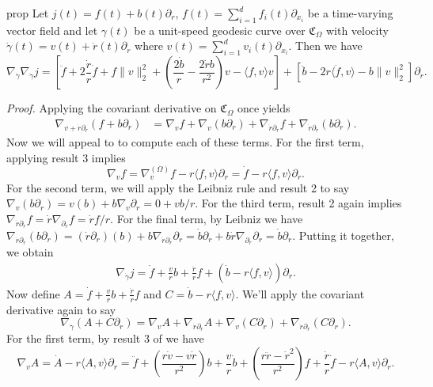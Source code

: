 \documentclass[11pt]{article}
\begin{document}
\begin{restatable}{prop}{} \label{jacobi equation on cone p1}
    Let $j(t) = f(t) + b(t)\partial_r$, $f(t) = \sum_{i = 1}^df_i(t)\partial_{x_i}$ be a time-varying vector field and let $\gamma(t)$ be a unit-speed geodesic curve over $\mathfrak{C}_\Omega$ with velocity $\dot \gamma(t) = v(t) + \dot r(t)\partial_r$ where $v(t) = \sum_{i = 1}^dv_i(t)\partial_{x_i}$. Then we have 
    \[\nabla_{\dot \gamma} \nabla_{\dot \gamma}j = \left[\ddot f + 2\frac{\dot r}{r}\dot f + f\|v\|_2^2  + \left(\frac{2\dot b}{r} - \frac{2 \dot rb}{r^2}\right)v - \langle f,v\rangle v\right] + \left[\ddot b - 2r\langle \dot f, v\rangle - b\|v\|_2^2\right]\partial_r.\]
\end{restatable}
\noindent \textit{Proof.} Applying the covariant derivative on $\mathfrak{C}_\Omega$ once yields
\begin{align*}
    \nabla_{v + \dot r \partial_r}(f + b\partial_r) &= \nabla_vf + \nabla_v(b\partial_r) + \nabla_{\dot r\partial_r}f + \nabla_{\dot r\partial_r}(b\partial_r).
\end{align*}
Now we will appeal to  to compute each of these terms. For the first term, applying result 3 implies
\[\nabla_vf = \nabla_{v}^{(\Omega)}f - r\langle f, v\rangle \partial_r = \dot f - r\langle f, v\rangle \partial_r.\]
For the second term, we will apply the Leibniz rule and result 2 to say $\nabla_v(b\partial_r) = v(b) + b\nabla_v\partial_r = 0 + vb/r$. For the third term, result 2 again implies $\nabla_{\dot r\partial_r}f = \dot r\nabla_{\partial_r}f = \dot rf/r.$ For the final term, by Leibniz we have $\nabla_{\dot r\partial_r}(b\partial_r) = (\dot r\partial_r)(b) + b\nabla_{\dot r\partial_r}\partial_r = \dot b\partial_r + b\dot r\nabla_{\partial_r}\partial_r = \dot b \partial_r$.
Putting it together, we obtain
\begin{align*}
    \nabla_{\dot \gamma}j = \dot f + \frac{v}{r}b + \frac{\dot r}{r}f + \left(\dot b - r \langle f, v\rangle \right)\partial_r.
\end{align*}
Now define $A = \dot f + \frac{v}{r}b + \frac{\dot r}{r}f$ and $C = \dot b - r \langle f, v\rangle $. We'll apply the covariant derivative again to say
\[\nabla_{\dot \gamma} (A + C\partial_r)  = \nabla_vA + \nabla_{\dot r\partial_r}A + \nabla_v(C\partial_r) + \nabla_{\dot r\partial_r}(C\partial_r).\]
For the first term, by result 3 of  we have 
\[\nabla_vA = \dot A - r\langle A, v\rangle \partial_r = \ddot f + \left(\frac{r\dot v - v\dot r}{r^2}\right)b + \frac{v}{r}\dot b + \left(\frac{r\ddot r - \dot r^2}{r^2}\right)f + \frac{\dot r}{r}\dot f - r\langle A, v\rangle \partial_r.\]
\end{document}
